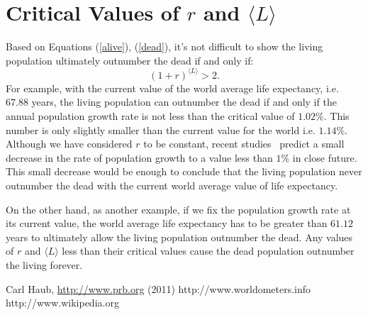 \documentclass[DIV=calc, paper=a4, fontsize=11pt, twocolumn]{scrartcl}	 %
\begin{document}
\section*{Critical Values of $r$ and $\langle L\rangle$}
Based on Equations (\ref{alive}), (\ref{dead}), it's not difficult to show the living population ultimately outnumber the dead if and only if:
\begin{equation}
(1+r)^{\langle L\rangle} > 2.
\end{equation}
For example, with the current value of the world average life expectancy, i.e. $67.88$ years, the living population can outnumber the dead if and only if the annual population growth rate is not less than the critical value of $1.02\%$. This number is only slightly smaller than the current value for the world i.e. $1.14\%$. Although we have considered $r$ to be constant, recent studies~\cite{worldometers} predict a small decrease in the rate of population growth to a value less than $1\%$ in close future. This small decrease would be enough to conclude that the living population never outnumber the dead with the current world average value of life expectancy.

On the other hand, as another example, if we fix the population growth rate at its current value, the world average life expectancy has to be greater than $61.12$ years to ultimately allow the living population outnumber the dead. Any values of $r$ and $\langle L\rangle$ less than their critical values cause the dead population outnumber the living forever.


\begin{thebibliography}{99} %

 Carl Haub, \href{http://www.prb.org/Publications/Articles/2002/HowManyPeopleHaveEverLivedonEarth.aspx}{http://www.prb.org} (2011)
 http://www.worldometers.info
 http://www.wikipedia.org

\end{thebibliography}

\end{document}
